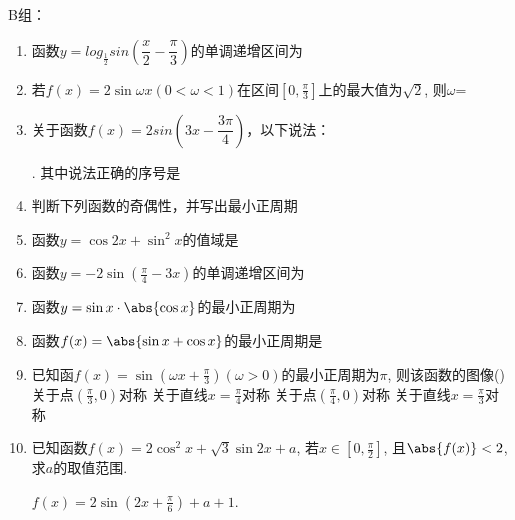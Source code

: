 B组：
\begin{enumerate}
    \item 函数$y = log_{\frac{1}{2}}sin\left(\dfrac{x}{2} - \dfrac{\pi}{3}\right)$的单调递增区间为\blkda[6]{$\left[\dfrac{5\pi}{3}+4k\pi, \dfrac{8\pi}{3}+4k\pi \right), k \in \mathbf{Z}$}
    \item 若$f(x)=2\sin\omega{x}(0<\omega<1)$在区间$\left[0,\frac{\pi}{3}\right]$上的最大值为$\sqrt{2}$, 则$\omega$=
    \item 关于函数$f(x) = 2sin\left(3x - \dfrac{3\pi}{4}\right)$，以下说法：
    . 其中说法正确的序号是
    \item 判断下列函数的奇偶性，并写出最小正周期
    \item 函数$y=\cos2x+\sin^2x$的值域是\blkda{$[0,1]$}
    \item 函数$y=-2\sin(\frac{\pi}{4}-3x)$的单调递增区间为
    \item 函数$y=\sin{x}\cdot\abs{\cos{x}}$的最小正周期为\blkda{$2\pi$}
    \item 函数$f(x)=\abs{\sin{x}+\cos{x}}$的最小正周期是 \blkda{$\pi$}
    \item 已知函$f(x)=\sin\left(\omega{x}+\frac{\pi}{3}\right)(\omega>0)$的最小正周期为$\pi$, 则该函数的图像\dotfill()
    \xx
    {关于点$(\frac{\pi}{3},0)$对称}
    {关于直线$x=\frac{\pi}{4}$对称}
    {关于点$(\frac{\pi}{4},0)$对称}
    {关于直线$x=\frac{\pi}{3}$对称}
    \item 已知函数$f(x)=2\cos^2x+\sqrt{3}\sin2x+a$, 若$x\in\left[0,\frac{\pi}{2}\right]$, 且$\abs{f(x)}<2$, 求$a$的取值范围.
    \begin{jieda}
    $f(x)=2\sin(2x+\frac{\pi}{6})+a+1$. \\

\end{jieda}
\end{enumerate}
